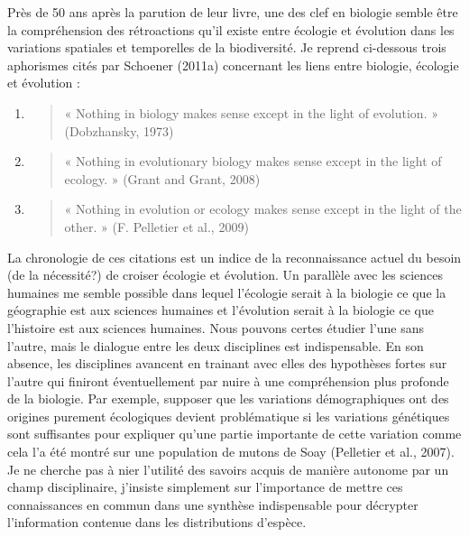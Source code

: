 Près de 50 ans après la parution de leur livre, une des clef en biologie
semble être la compréhension des rétroactions qu'il existe entre
écologie et évolution dans les variations spatiales et temporelles de la
biodiversité. Je reprend ci-dessous trois aphorismes cités par Schoener
(2011a) concernant les liens entre biologie, écologie et évolution :

\begin{enumerate}
\def\labelenumi{\arabic{enumi}.}
\item
  \begin{quote}
  « Nothing in biology makes sense except in the light of evolution. »
  (Dobzhansky, 1973)
  \end{quote}
\item
  \begin{quote}
  « Nothing in evolutionary biology makes sense except in the light of
  ecology. » (Grant and Grant, 2008)
  \end{quote}
\item
  \begin{quote}
  « Nothing in evolution or ecology makes sense except in the light of
  the other. » (F. Pelletier et al., 2009)
  \end{quote}
\end{enumerate}

La chronologie de ces citations est un indice de la reconnaissance
actuel du besoin (de la nécessité?) de croiser écologie et évolution. Un
parallèle avec les sciences humaines me semble possible dans lequel
l'écologie serait à la biologie ce que la géographie est aux sciences
humaines et l'évolution serait à la biologie ce que l'histoire est aux
sciences humaines. Nous pouvons certes étudier l'une sans l'autre, mais
le dialogue entre les deux disciplines est indispensable. En son
absence, les disciplines avancent en trainant avec elles des hypothèses
fortes sur l'autre qui finiront éventuellement par nuire à une
compréhension plus profonde de la biologie. Par exemple, supposer que
les variations démographiques ont des origines purement écologiques
devient problématique si les variations génétiques sont suffisantes pour
expliquer qu'une partie importante de cette variation comme cela l'a été
montré sur une population de mutons de Soay (Pelletier et al., 2007). Je
ne cherche pas à nier l'utilité des savoirs acquis de manière autonome
par un champ disciplinaire, j'insiste simplement sur l'importance de
mettre ces connaissances en commun dans une synthèse indispensable pour
décrypter l'information contenue dans les distributions d'espèce.

